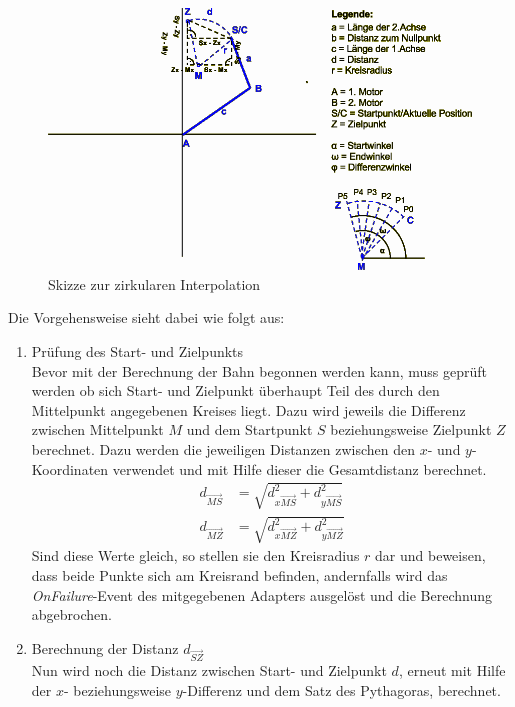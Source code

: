 \begin{itemize}
\begin{figure}[H]
  \centering
  \begin{minipage}[t]{14 cm}
  	\centering
  	\includegraphics[width=12cm]{images/Zirkularinterpolation} 
    \caption{Skizze zur zirkularen Interpolation}
  \end{minipage}
\end{figure}
Die Vorgehensweise sieht dabei wie folgt aus:
\begin{enumerate}
\item Prüfung des Start- und Zielpunkts\\
Bevor mit der Berechnung der Bahn begonnen werden kann, muss geprüft werden ob sich Start- und Zielpunkt überhaupt Teil des durch den Mittelpunkt angegebenen Kreises liegt. Dazu wird jeweils die Differenz zwischen Mittelpunkt $M$ und dem Startpunkt $S$ beziehungsweise Zielpunkt $Z$ berechnet. Dazu werden die jeweiligen Distanzen zwischen den $x$- und $y$-Koordinaten verwendet und mit Hilfe dieser die Gesamtdistanz berechnet.
\begin{align*}
d_{\overrightarrow{MS}} & = \sqrt{d_{x\overrightarrow{MS}}^2 + d_{y\overrightarrow{MS}}^2}\\
d_{\overrightarrow{MZ}} & = \sqrt{d_{x\overrightarrow{MZ}}^2 + d_{y\overrightarrow{MZ}}^2}
\end{align*}
Sind diese Werte gleich, so stellen sie den Kreisradius $r$ dar und beweisen, dass beide Punkte sich am Kreisrand befinden, andernfalls wird das \textit{OnFailure}-Event des mitgegebenen Adapters ausgelöst und die Berechnung abgebrochen. 
\item Berechnung der Distanz $d_{\overrightarrow{SZ}}$\\
Nun wird noch die Distanz zwischen Start- und Zielpunkt $d$, erneut mit Hilfe der $x$- beziehungsweise $y$-Differenz und dem Satz des Pythagoras, berechnet.

\end{enumerate}
\end{itemize}
